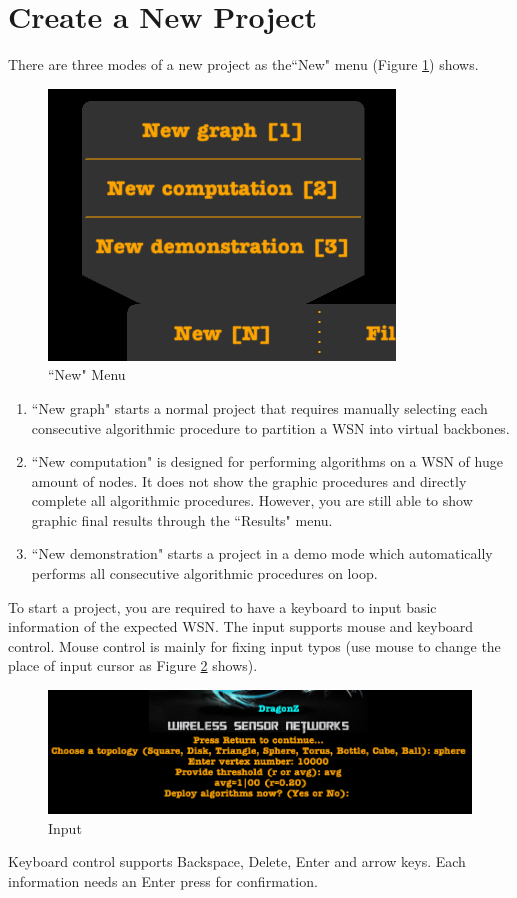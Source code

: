 \documentclass[11pt]{amsart}
\begin{document}
\section{Create a New Project}
There are three modes of a new project as the``New" menu (Figure \ref{fig:new}) shows.
 \begin{figure}[htp]
	\centering
	\includegraphics[width=.3\linewidth]{images/New.png}
	\caption{``New" Menu}
	\label{fig:new}
\end{figure}
\begin{enumerate}
	\item``New graph" starts a normal project that requires manually selecting each consecutive algorithmic procedure to partition a \ac{WSN} into virtual backbones.
	\item``New computation" is designed for performing algorithms on a \ac{WSN} of huge amount of nodes. It does not show the graphic procedures and directly complete all algorithmic procedures. However, you are still able to show graphic final results through the ``Results" menu.
	\item``New demonstration" starts a project in a demo mode which automatically performs all consecutive algorithmic procedures on loop.
\end{enumerate}

To start a project, you are required to have a keyboard to input basic information of the expected \ac{WSN}. The input supports mouse and keyboard control. Mouse control is mainly for fixing input typos (use mouse to change the place of input cursor as Figure \ref{fig:input} shows).
 \begin{figure}[htp]
	\centering
	\includegraphics[width=.8\linewidth]{images/input.png}
	\caption{Input}
	\label{fig:input}
\end{figure}
Keyboard control supports Backspace, Delete, Enter and arrow keys. Each information needs an Enter press for confirmation.
\end{document}
